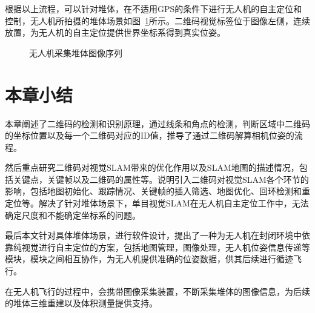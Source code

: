 根据以上流程，可以针对堆体，在不适用GPS的条件下进行无人机的自主定位和控制，无人机所拍摄的堆体场景如图~\ref{fig:2VSLAM_big}所示。二维码视觉标签位于图像左侧，连续放置，为无人机的自主定位提供世界坐标系得到真实位姿。
\begin{figure}[t]
  \centering
    \vskip0.2cm
    \vskip0.2cm      
  \vskip0.2cm

  \caption{无人机采集堆体图像序列}\label{fig:2VSLAM_big}
\end{figure}





\section{本章小结}
\label{sec:2.5}
本章阐述了二维码的检测和识别原理，通过线条和角点的检测，判断区域中二维码的坐标位置以及每一个二维码对应的ID值，推导了通过二维码解算相机位姿的流程。

然后重点研究二维码对视觉SLAM带来的优化作用以及SLAM地图的描述情况，包括关键点，关键帧以及二维码的属性等。说明引入二维码对视觉SLAM各个环节的影响，包括地图初始化、跟踪情况、关键帧的插入筛选、地图优化、回环检测和重定位等。解决了针对堆体场景下，单目视觉SLAM在无人机自主定位工作中，无法确定尺度和不能确定坐标系的问题。

最后本文针对具体堆体场景，进行软件设计，提出了一种为无人机在封闭环境中依靠纯视觉进行自主定位的方案，包括地图管理，图像处理，无人机位姿信息传递等模块，模块之间相互协作，为无人机提供准确的位姿数据，供其后续进行循迹飞行。

在无人机飞行的过程中，会携带图像采集装置，不断采集堆体的图像信息，为后续的堆体三维重建以及体积测量提供支持。 
